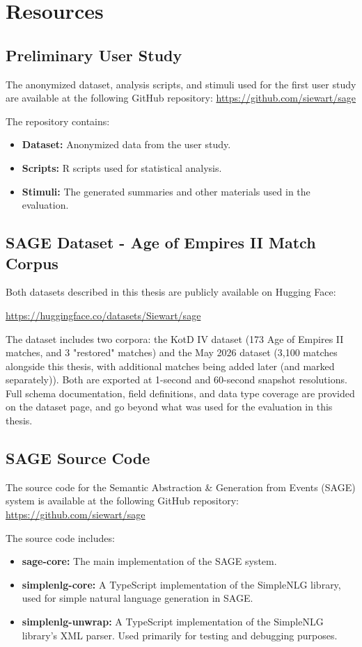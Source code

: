 \chapter{Resources}
\section{Preliminary User Study}
\label{app:preliminary-analysis}
The anonymized dataset, analysis scripts, and stimuli used for the first user study are available at the following GitHub repository: \url{https://github.com/siewart/sage}

The repository contains:
\begin{itemize}
  \item \textbf{Dataset:} Anonymized data from the user study.
  \item \textbf{Scripts:} R scripts used for statistical analysis.
  \item \textbf{Stimuli:} The generated summaries and other materials used in the evaluation.
\end{itemize}


\section{SAGE Dataset - Age of Empires II Match Corpus}
\label{app:corpus}
Both datasets described in this thesis are publicly available on Hugging Face:

\url{https://huggingface.co/datasets/Siewart/sage}

The dataset includes two corpora: the KotD IV dataset (173 Age of Empires II matches, and 3 "restored" matches) and the May 2026 dataset (3,100 matches alongside this thesis, with additional matches being added later (and marked separately)). Both are exported at 1-second and 60-second snapshot resolutions. Full schema documentation, field definitions, and data type coverage are provided on the dataset page, and go beyond what was used for the evaluation in this thesis.

\section{SAGE Source Code}
\label{app:source-code}
The source code for the Semantic Abstraction \& Generation from Events (SAGE) system is available at the following GitHub repository:
\url{https://github.com/siewart/sage}

The source code includes:
\begin{itemize}
  \item \textbf{sage-core:} The main implementation of the SAGE system.
  \item \textbf{simplenlg-core:} A TypeScript implementation of the SimpleNLG library, used for simple natural language generation in SAGE.
  \item \textbf{simplenlg-unwrap:} A TypeScript implementation of the SimpleNLG library's XML parser. Used primarily for testing and debugging purposes.
\end{itemize}

